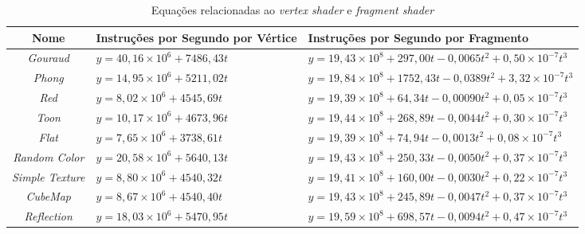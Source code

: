 	\begin{table}[ht]
	\centering	
	\begin{tabularx}{0.9\textwidth}{cXX}
		\toprule
		\textbf{Nome} & \textbf{Instruções por Segundo por Vértice} & \textbf{Instruções por Segundo por Fragmento}  \\
		\midrule
		\textit{Gouraud} & $y = 40,16 \times 10^6 + 7486,43t$ & $y = 19,43 \times 10 ^8 + 297,00t - 0,0065t^2 + 0,50 \times 10^{-7}t^3 $  \\
		\textit{Phong} &  $y = 14,95 \times 10^6 + 5211,02t$ & $y = 19,84 \times 10^8 + 1752,43t - 0,0389t^2 + 3,32 \times 10^{-7}t^3$ \\
		\textit{Red} & $y = 8,02 \times 10^6 + 4545,69t$ & $y = 19,39 \times 10 ^8 + 64,34t - 0,00090t^2 + 0,05 \times 10^{-7}t^3$\\
		\textit{Toon} & $y = 10,17 \times 10^6 + 4673,96t$ & $y = 19,44 \times 10 ^8 + 268,89t - 0,0044t^2 + 0,30 \times 10^{-7}t^3$\\
		\textit{Flat} & $y = 7,65 \times 10^6 + 3738,61t$ & $y = 19,39 \times 10 ^8 + 74,94t - 0,0013t^2 + 0,08 \times 10^{-7}t^3$ \\
		\textit{Random Color} & $y = 20,58 \times 10^6 + 5640,13t$ & $y = 19,43 \times 10 ^8 + 250,33t - 0,0050t^2 + 0,37 \times 10^{-7}t^3$\\
		\textit{Simple Texture} & $y = 8,80 \times 10^6 + 4540,32t$ & $y = 19,41 \times 10 ^8 + 160,00t - 0,0030t^2 + 0,22 \times 10^{-7}t^3$\\
		\textit{CubeMap} & $y = 8,67 \times 10^6 + 4540,40t$ & $y = 19,43 \times 10 ^8 + 245,89t - 0,0047t^2 + 0,37 \times 10^{-7}t^3$ \\
		\textit{Reflection} & $y = 18,03 \times 10^6 + 5470,95t$ & $y = 19,59 \times 10 ^8 + 698,57t - 0,0094t^2 + 0,47 \times 10^{-7}t^3$ \\
	
		\bottomrule
	\end{tabularx}
	\caption{Equações relacionadas ao \textit{vertex shader} e \textit{fragment shader}}
	\label{equacoes}
	\end{table}

